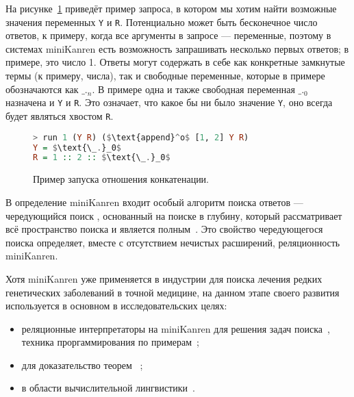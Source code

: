 На рисунке~\ref{fig:appendoExample} приведёт пример запроса, в котором мы хотим
найти возможные значения переменных \lstinline{Y} и \lstinline{R}. Потенциально
может быть бесконечное число ответов, к примеру, когда все аргументы в запросе
--- переменные, поэтому в системах miniKanren есть возможность запрашивать
несколько первых ответов; в примере, это число 1. Ответы могут содержать в себе
как конкретные замкнутые термы (к примеру, числа), так и свободные переменные,
которые в примере обозначаются как $\text{\_.}_n$. В примере одна и также
свободная переменная $\text{\_.}_0$ назначена и \lstinline{Y} и \lstinline{R}.
Это означает, что какое бы ни было значение \lstinline{Y}, оно всегда будет
являться хвостом \lstinline{R}.

\begin{figure}[h!]
\begin{lstlisting}[mathescape,language=Haskell,extendedchars=\true,frame=single,basicstyle=\ttfamily]
> run 1 (Y R) ($\text{append}^o$ [1, 2] Y R)
Y = $\text{\_.}_0$
R = 1 :: 2 :: $\text{\_.}_0$
\end{lstlisting}
\caption{Пример запуска отношения конкатенации.}
\label{fig:appendoExample}
\end{figure}

В определение miniKanren входит особый алгоритм поиска ответов --- чередующийся
поиск , основанный на поиске в глубину,
который рассматривает всё пространство поиска и является
полным~\cite{interleaving}.
Это свойство чередующегося поиска определяет, вместе с отсутствием
нечистых расширений, реляционность miniKanren. 

Хотя miniKanren уже применяется в индустрии для поиска лечения редких
генетических заболеваний в точной медицине\cite{medMK},
на данном этапе своего развития используется в основном в исследовательских
целях:
\begin{itemize}
\item реляционные интерпретаторы на miniKanren для решения задач поиска~\cite{lozov},
      техника проргаммирования по примерам~\cite{unifiedMK};
\item для доказательство теорем~\cite{mkProver} ;
\item в области вычислительной лингвистики~\cite{mkLing}.
\end{itemize}

